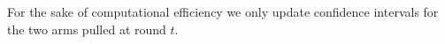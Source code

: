 For the sake of computational efficiency we only update confidence intervals for the two arms pulled at round $t$. 

